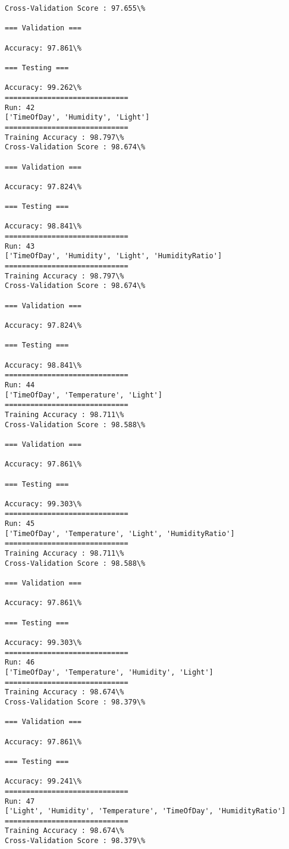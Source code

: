 \documentclass[11pt]{article}
\begin{document}
    \begin{Verbatim}[commandchars=\\\{\}]
Cross-Validation Score : 97.655\%

=== Validation ===

Accuracy: 97.861\%

=== Testing ===

Accuracy: 99.262\%
=============================
Run: 42
['TimeOfDay', 'Humidity', 'Light']
=============================
Training Accuracy : 98.797\%
Cross-Validation Score : 98.674\%

=== Validation ===

Accuracy: 97.824\%

=== Testing ===

Accuracy: 98.841\%
=============================
Run: 43
['TimeOfDay', 'Humidity', 'Light', 'HumidityRatio']
=============================
Training Accuracy : 98.797\%
Cross-Validation Score : 98.674\%

=== Validation ===

Accuracy: 97.824\%

=== Testing ===

Accuracy: 98.841\%
=============================
Run: 44
['TimeOfDay', 'Temperature', 'Light']
=============================
Training Accuracy : 98.711\%
Cross-Validation Score : 98.588\%

=== Validation ===

Accuracy: 97.861\%

=== Testing ===

Accuracy: 99.303\%
=============================
Run: 45
['TimeOfDay', 'Temperature', 'Light', 'HumidityRatio']
=============================
Training Accuracy : 98.711\%
Cross-Validation Score : 98.588\%

=== Validation ===

Accuracy: 97.861\%

=== Testing ===

Accuracy: 99.303\%
=============================
Run: 46
['TimeOfDay', 'Temperature', 'Humidity', 'Light']
=============================
Training Accuracy : 98.674\%
Cross-Validation Score : 98.379\%

=== Validation ===

Accuracy: 97.861\%

=== Testing ===

Accuracy: 99.241\%
=============================
Run: 47
['Light', 'Humidity', 'Temperature', 'TimeOfDay', 'HumidityRatio']
=============================
Training Accuracy : 98.674\%
Cross-Validation Score : 98.379\%


\end{Verbatim}
\end{document}
